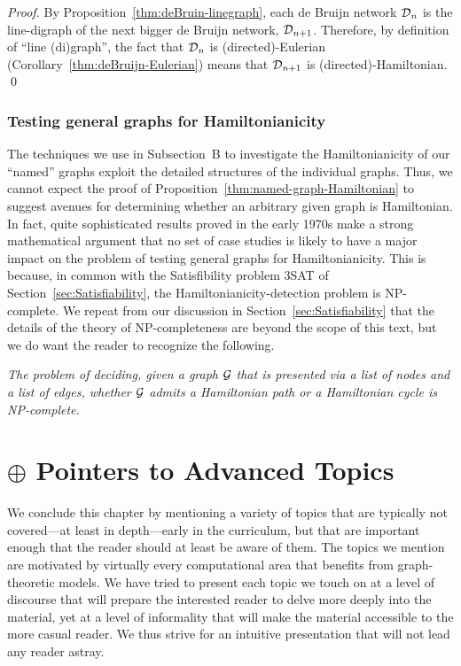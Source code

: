 \begin{proof}
By Proposition~\ref{thm:deBruin-linegraph}, each de Bruijn network
$\mbox{$\cal D$}_n$ is the line-digraph of the next bigger de Bruijn network,
$\mbox{$\cal D$}_{n+1}$.  Therefore, by definition of ``line (di)graph'', the fact
that $\mbox{$\cal D$}_n$ is (directed)-Eulerian
(Corollary~\ref{thm:deBruijn-Eulerian}) means that $\mbox{$\cal D$}_{n+1}$ is
(directed)-Hamiltonian.  \qed
\end{proof}


\subsubsection{Testing general graphs for Hamiltonianicity}
\label{sec:Hamiltonian-unweighted}

The techniques we use in Subsection~{\small\sf B} to investigate the
Hamiltonianicity of our ``named'' graphs exploit the detailed
structures of the individual graphs.  Thus, we cannot expect the proof
of Proposition~\ref{thm:named-graph-Hamiltonian} to suggest avenues
for determining whether an arbitrary given graph is Hamiltonian.  In
fact, quite sophisticated results proved in the early 1970s make a
strong mathematical argument that no set of case studies is likely to
have a major impact on the problem of testing general graphs for
Hamiltonianicity.  This is because, in common with the Satisfibility
problem {\sf 3SAT} of Section~\ref{sec:Satisfiability}, the
Hamiltonianicity-detection problem is {\sf NP}-complete.  We repeat
from our discussion in Section~\ref{sec:Satisfiability} that the
details of the theory of {\sf NP}-completeness are beyond the scope of
this text, but we do want the reader to recognize the following.
\begin{description}
\item
{\it The problem of deciding, given a graph $\mbox{$\cal G$}$ that is presented via
  a list of nodes and a list of edges, whether $\mbox{$\cal G$}$ admits a
  Hamiltonian path or a Hamiltonian cycle is {\sf NP}-complete.}
\end{description}



\section{$\oplus$ Pointers to Advanced Topics}
\label{sec:advanced-topics}


We conclude this chapter by mentioning a variety of topics that are
typically not covered---at least in depth---early in the curriculum,
but that are important enough that the reader should at least be aware
of them.  The topics we mention are motivated by virtually every
computational area that benefits from graph-theoretic models.  We have
tried to present each topic we touch on at a level of discourse that
will prepare the interested reader to delve more deeply into the
material, yet at a level of informality that will make the material
accessible to the more casual reader.  We thus strive for an intuitive
presentation that will not lead any reader astray.

